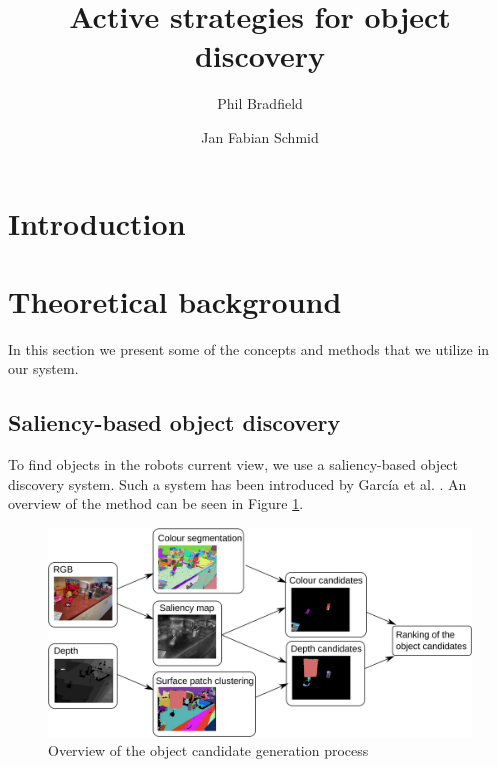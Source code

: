 \documentclass[a4paper,11pt,english]{article}
\begin{document}
\title{Active strategies for object discovery}
\author{Phil Bradfield \and Jan Fabian Schmid}
	
\maketitle 

\section{Introduction}
\label{Introduction}



\section{Theoretical background}
\label{Theoretical_background}

In this section we present some of the concepts and methods that we utilize in our system.

\subsection{Saliency-based object discovery}
\label{Theoretical_background:Saliency-based_object_discovery}
To find objects in the robots current view, we use a saliency-based object discovery system.
Such a system has been introduced by García et al. \cite{garcia2015saliency}.
An overview of the method can be seen in Figure \ref{fig:2Dobject_discovery}.

\begin{figure}[h!]
	\begin{center}
		\includegraphics[width=1\textwidth]{src/saliency_object_detection.png}
		\caption{ Overview of the object candidate generation process \cite{garcia2015saliency}}
		\label{fig:2Dobject_discovery}
	\end{center}
\end{figure}
\end{document}
